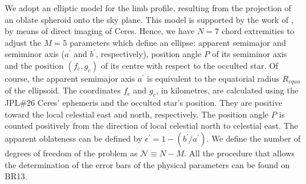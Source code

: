 \documentclass[useAMS,usenatbib]{mn2e}
\begin{document}
We adopt an elliptic model for the limb profile, resulting from the projection of an oblate spheroid onto the sky plane. This model is supported by the work of \cite{Drummond2014}, by means of direct imaging of Ceres. Hence, we have $N=7$ chord extremities to adjust the $M=5$ parameters which define an ellipse: apparent semimajor and semiminor axis ($a^\prime$ and $b^\prime$, respectively), position angle $P$ of its semiminor axis and the position $(f_c,g_c)$ of its centre with respect to the occulted star. 
Of course, the apparent semimajor axis {$a^\prime$} is equivalent to the equatorial radius $R_{equa}$ of the ellipsoid.
The coordinates $f_{c}$ and $g_{c}$, in kilometres, are calculated using the JPL\#26 Ceres' ephemeris and the occulted star's position. They are positive toward the local celestial east and north, respectively. The position angle $P$ is counted positively from the direction of local celestial north to celestial east. The apparent oblateness can be defined by $\epsilon^\prime = 1 - (b^\prime/a^\prime)$. We define the number of degrees of freedom of the problem as $\mathcal{N} \equiv N - M$.  All the procedure that allows the determination of the error bars of the physical parameters can be found on BR13.

\end{document}
